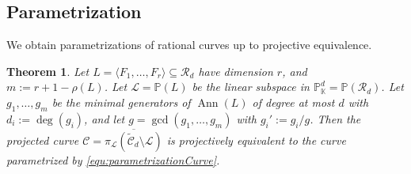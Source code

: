\documentclass[a4paper, 11pt]{amsart}
\newtheorem{theorem}{Theorem}
\numberwithin{theorem}{section}
\theoremstyle{definition}
\numberwithin{equation}{section}
\DeclareMathOperator{\Ann}{\operatorname{Ann}}
\begin{document}
\subsection{Parametrization}\label{subsec:Parametrization}
We obtain parametrizations of rational curves up to projective equivalence.
\begin{theorem}\label{thm:parametrizedCurve}
Let $L = \langle F_1, \dots, F_r \rangle \subseteq \mathcal{R}_d$ have dimension $r$, and $m := r + 1 - \rho(L)$. 
Let $\mathcal{L} = \mathbb{P}(L)$ be the linear subspace in $\mathbb{P}_{\mathbb{K}}^d = \mathbb{P}(\mathcal{R}_d)$.
Let $g_1, \dots, g_m$ be the minimal generators of $\Ann(L)$ of degree at most $d$ with $d_i := \deg(g_i)$, and let $g = \gcd(g_1, \dots, g_m)$ with $g_i' := g_i/g$. 
Then the projected curve $\mathcal{C} = \overline{\pi_{\mathcal{L}}(\widetilde{\mathcal{C}}_d \setminus \mathcal{L})}$ is projectively equivalent to the curve parametrized by \eqref{equ:parametrizationCurve}.
\end{theorem}
\end{document}
